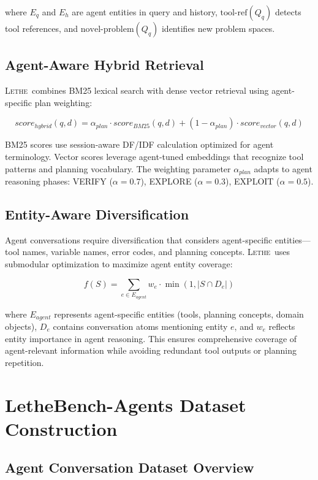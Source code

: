 \documentclass[letterpaper]{article}
\newcommand{\lethe}{\textsc{Lethe}}
\begin{document}
where $E_q$ and $E_h$ are agent entities in query and history, $\text{tool-ref}(Q_q)$ detects tool references, and $\text{novel-problem}(Q_q)$ identifies new problem spaces.

\subsection{Agent-Aware Hybrid Retrieval}

\lethe\ combines BM25 lexical search with dense vector retrieval using agent-specific plan weighting:

\begin{equation}
score_{hybrid}(q, d) = \alpha_{plan} \cdot score_{BM25}(q, d) + (1 - \alpha_{plan}) \cdot score_{vector}(q, d)
\end{equation}

BM25 scores use session-aware DF/IDF calculation optimized for agent terminology. Vector scores leverage agent-tuned embeddings that recognize tool patterns and planning vocabulary. The weighting parameter $\alpha_{plan}$ adapts to agent reasoning phases: VERIFY ($\alpha = 0.7$), EXPLORE ($\alpha = 0.3$), EXPLOIT ($\alpha = 0.5$).

\subsection{Entity-Aware Diversification}

Agent conversations require diversification that considers agent-specific entities—tool names, variable names, error codes, and planning concepts. \lethe\ uses submodular optimization to maximize agent entity coverage:

\begin{equation}
f(S) = \sum_{e \in E_{agent}} w_e \cdot \min(1, |S \cap D_e|)
\end{equation}

where $E_{agent}$ represents agent-specific entities (tools, planning concepts, domain objects), $D_e$ contains conversation atoms mentioning entity $e$, and $w_e$ reflects entity importance in agent reasoning. This ensures comprehensive coverage of agent-relevant information while avoiding redundant tool outputs or planning repetition.

\section{LetheBench-Agents Dataset Construction}

\subsection{Agent Conversation Dataset Overview}
\end{document}
